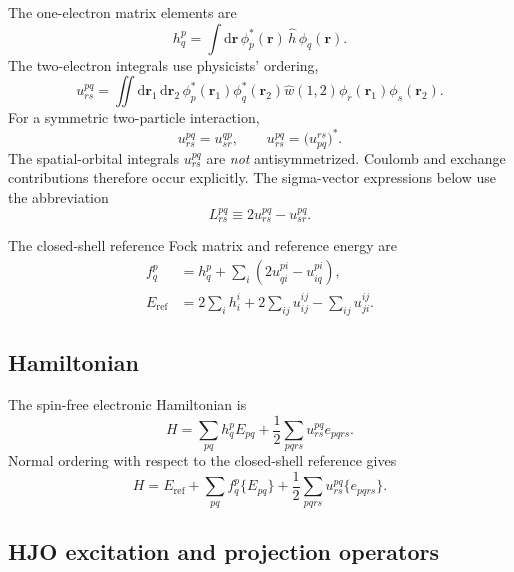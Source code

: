 \documentclass[10pt]{article}
\newcommand{\Eref}{E_{\mathrm{ref}}}
\begin{document}
The one-electron matrix elements are
\begin{equation}
 h^{p}_{q}
 =\int\!\mathrm{d}\mathbf r\,
   \phi_p^{*}(\mathbf r)\,\hat h\,\phi_q(\mathbf r).
\end{equation}
The two-electron integrals use physicists' ordering,
\begin{equation}
 u^{pq}_{rs}
 =\iint\!\mathrm{d}\mathbf r_1\,\mathrm{d}\mathbf r_2\,
   \phi_p^{*}(\mathbf r_1)\phi_q^{*}(\mathbf r_2)
   \hat w(1,2)
   \phi_r(\mathbf r_1)\phi_s(\mathbf r_2).
\end{equation}
For a symmetric two-particle interaction,
\begin{equation}
 u^{pq}_{rs}=u^{qp}_{sr},
 \qquad
 u^{pq}_{rs}=\bigl(u^{rs}_{pq}\bigr)^{*}.
\end{equation}
The spatial-orbital integrals $u^{pq}_{rs}$ are \emph{not}
antisymmetrized. Coulomb and exchange contributions therefore occur
explicitly. The sigma-vector expressions below use the abbreviation
\begin{equation}
 L^{pq}_{rs}\equiv 2u^{pq}_{rs}-u^{pq}_{sr}.
\end{equation}

The closed-shell reference Fock matrix and reference energy are
\begin{align}
 f^{p}_{q}
 &=h^{p}_{q}
   +\sum_i\left(2u^{pi}_{qi}-u^{pi}_{iq}\right),
 \\
 \Eref
 &=2\sum_i h^{i}_{i}
   +2\sum_{ij}u^{ij}_{ij}
   -\sum_{ij}u^{ij}_{ji}.
\end{align}

\subsection{Hamiltonian}

The spin-free electronic Hamiltonian is
\begin{equation}
 H
 =\sum_{pq}h^{p}_{q}E_{pq}
  +\frac12\sum_{pqrs}u^{pq}_{rs}e_{pqrs}.
\end{equation}
Normal ordering with respect to the closed-shell reference gives
\begin{equation}
 H
 =\Eref
  +\sum_{pq}f^{p}_{q}\{E_{pq}\}
  +\frac12\sum_{pqrs}u^{pq}_{rs}\{e_{pqrs}\}.
\end{equation}

\subsection{HJO excitation and projection operators}
\end{document}
